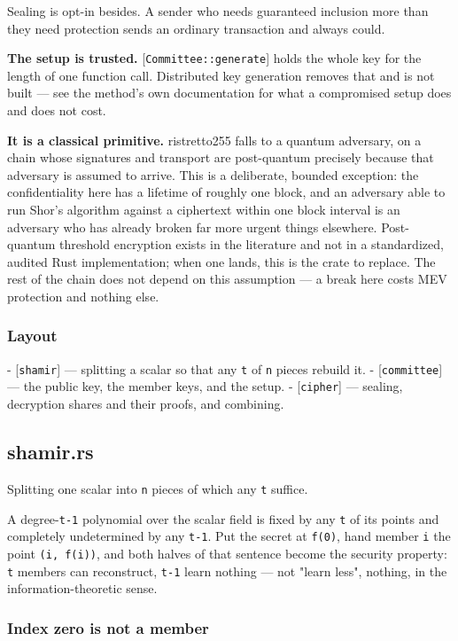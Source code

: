 \documentclass[11pt,a4paper]{article}
\begin{document}
Sealing is opt-in besides. A sender who needs guaranteed inclusion more than
they need protection sends an ordinary transaction and always could.

\textbf{The setup is trusted.} [\texttt{Committee::generate}] holds the whole key for
the length of one function call. Distributed key generation removes that and
is not built — see the method's own documentation for what a compromised
setup does and does not cost.

\textbf{It is a classical primitive.} ristretto255 falls to a quantum adversary,
on a chain whose signatures and transport are post-quantum precisely because
that adversary is assumed to arrive. This is a deliberate, bounded
exception: the confidentiality here has a lifetime of roughly one block, and
an adversary able to run Shor's algorithm against a ciphertext within one
block interval is an adversary who has already broken far more urgent things
elsewhere. Post-quantum threshold encryption exists in the literature and
not in a standardized, audited Rust implementation; when one lands, this is
the crate to replace. The rest of the chain does not depend on this
assumption — a break here costs MEV protection and nothing else.

\subsubsection{Layout}

- [\texttt{shamir}] — splitting a scalar so that any \texttt{t} of \texttt{n} pieces rebuild it.
- [\texttt{committee}] — the public key, the member keys, and the setup.
- [\texttt{cipher}] — sealing, decryption shares and their proofs, and combining.

\subsection{shamir.rs}
Splitting one scalar into \texttt{n} pieces of which any \texttt{t} suffice.

A degree-\texttt{t-1} polynomial over the scalar field is fixed by any \texttt{t} of its
points and completely undetermined by any \texttt{t-1}. Put the secret at \texttt{f(0)},
hand member \texttt{i} the point \texttt{(i, f(i))}, and both halves of that sentence
become the security property: \texttt{t} members can reconstruct, \texttt{t-1} learn
nothing — not "learn less", nothing, in the information-theoretic sense.

\subsubsection{Index zero is not a member}
\end{document}
